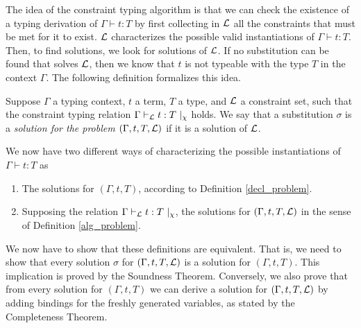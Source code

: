 
The idea of the constraint typing algorithm is that we can check the existence of a typing derivation of $\Gamma \vdash t : T$ by first
collecting in $\mathcal{L}$ all the constraints that must be met for it to exist. $\mathcal{L}$ characterizes the possible valid instantiations of
$\Gamma \vdash t : T$. Then, to find solutions, we look for solutions of $\mathcal{L}$. If no substitution can be found that solves $\mathcal{L}$,
then we know that $t$ is not typeable with the type $T$ in the context $\Gamma$. The following definition formalizes this idea.

\begin{defn}
	\label{alg_problem}
	Suppose $\Gamma$ a typing context, $t$ a term, $T$ a type, and $\mathcal{L}$ a constraint set, such that the constraint typing relation
	$\Gamma \vdash_{\mathcal{L}} t : T ~|_\chi$ holds.
	We say that a substitution $\sigma$ is a {\em solution for the problem 	$(\Gamma, t, T, \mathcal{L})$} if it is a solution of $\mathcal{L}$.
\end{defn}

We now have two different ways of characterizing the possible instantiations of $\Gamma \vdash t : T$ as
 	\begin{enumerate}
 		\item The solutions for $(\Gamma, t, T)$, according to Definition \ref{decl_problem}.
 		\item Supposing the relation $\Gamma \vdash_{\mathcal{L}} t : T ~|_\chi$, the solutions for $(\Gamma, t, T, \mathcal{L})$ in the sense of Definition
 			\ref{alg_problem}.
 	\end{enumerate}

We now have to show that these definitions are equivalent. That is, we need to show that every solution $\sigma$ for $(\Gamma, t, T, \mathcal{L})$
is a solution for $(\Gamma, t, T)$. This implication is proved by the Soundness Theorem. Conversely, we also prove that from every solution
for $(\Gamma, t, T)$ we can derive a solution for $(\Gamma, t, T, \mathcal{L})$ by adding bindings for the freshly generated variables, as stated
by the Completeness Theorem.


